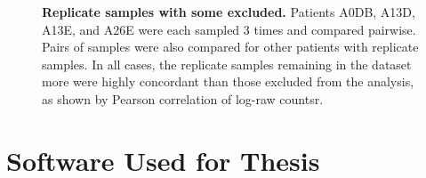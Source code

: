 \begin{figure}[!ht]
\begin{center}
%
%
    \end{center}
    \caption[]{\small \textbf{Replicate samples with some excluded.} Patients A0DB, A13D, A13E, and A26E were each sampled 3 times and compared pairwise. Pairs of samples were also compared for other patients with replicate samples. In all cases, the replicate samples remaining in the dataset more were highly concordant than those excluded from the analysis, as shown by Pearson correlation of log-raw countsr.
}
\label{fig:rep_keepcut}
\end{figure}


\chapter{Software Used for Thesis}
\label{appendix:software}




